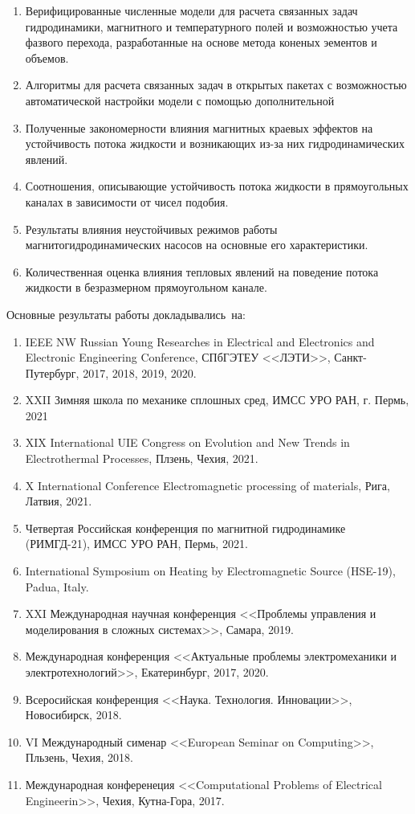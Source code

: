 {}
\begin{enumerate}[beginpenalty=10000] %
  \item Верифицированные численные модели  для расчета связанных задач гидродинамики, магнитного и температурного полей и возможностью учета фазвого перехода, разработанные на основе метода коненых эементов и объемов. 
  \item Алгоритмы для расчета связанных задач в открытых пакетах с возможностью автоматической настройки модели с помощью дополнительной
  \item Полученные закономерности влияния магнитных краевых эффектов на устойчивость потока жидкости и возникающих из-за них гидродинамических явлений.
  \item Соотношения, описывающие устойчивость потока жидкости в прямоугольных каналах в зависимости от чисел подобия. 
  \item Результаты влияния неустойчивых режимов работы магнитогидродинамических насосов на основные его характеристики. 
  \item Количественная оценка влияния тепловых явлений на поведение потока жидкости в безразмерном прямоугольном канале. 
  
\end{enumerate}


{\probation}
Основные результаты работы докладывались~на:
\begin{enumerate}[beginpenalty=10000] %
    \item IEEE NW Russian Young Researches in Electrical and Electronics and Electronic Engineering Conference, СПбГЭТЕУ <<ЛЭТИ>>, Санкт-Путербург, 2017, 2018, 2019, 2020. 
    \item XXII Зимняя школа по механике сплошных сред, ИМСС УРО РАН, г. Пермь, 2021
    \item XIX International UIE Congress on Evolution and New Trends in Electrothermal Processes, Плзень, Чехия, 2021. 
    \item X International Conference Electromagnetic processing of materials, Рига, Латвия, 2021.
    \item Четвертая Российская конференция по магнитной гидродинамике (РИМГД-21), ИМСС УРО РАН, Пермь, 2021.
    \item International Symposium on Heating by Electromagnetic Source (HSE-19), Padua, Italy.
    \item XXI Международная научная конференция <<Проблемы управления и моделирования в сложных системах>>, Самара, 2019.
    \item Международная конференция <<Актуальные проблемы электромеханики и электротехнологий>>, Екатеринбург, 2017, 2020. 
    \item Всеросийская конференция <<Наука. Технология. Инновации>>, Новосибирск, 2018. 
    \item VI Международный сименар  <<European Seminar on Computing>>, Пльзень, Чехия, 2018.
    \item Международная конференеция <<Computational Problems of Electrical Engineerin>>, Чехия, Кутна-Гора, 2017. 
\end{enumerate}

